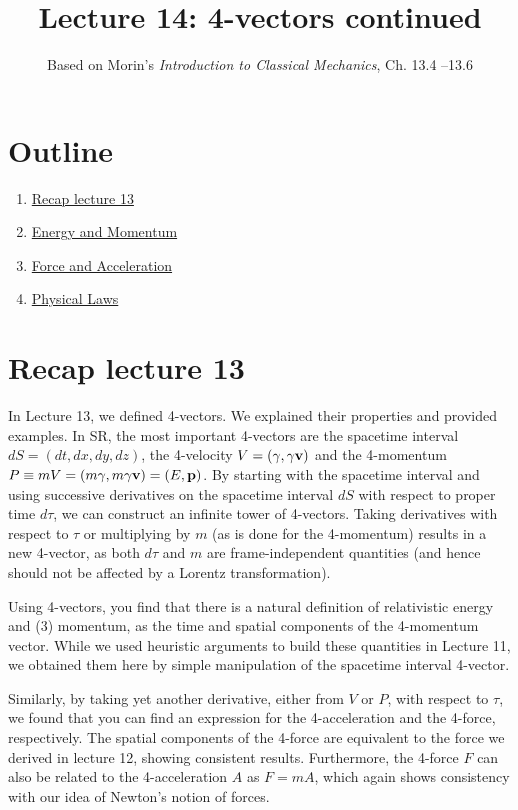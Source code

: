 \documentclass[12pt]{article}
\title{\textbf{Lecture 14: 4-vectors continued}}
\author{Based on Morin's \textit{Introduction to Classical Mechanics}, Ch. 13.4 --13.6}
\date{}
\begin{document}
\maketitle

\section*{Outline}
\begin{enumerate}
    \item \href{sec:recap}{Recap lecture 13}
    \item \href{sec:E&M}{Energy and Momentum}
    \item \href{sec:F&A}{Force and Acceleration}
    \item \href{sec:physics}{Physical Laws}
\end{enumerate}

\section{Recap lecture 13}\label{sec:recap}
In Lecture 13, we defined 4-vectors. We explained their properties and provided examples. In SR, the most important 4-vectors are the spacetime interval $dS = (dt,dx,dy,dz)$, the 4-velocity $V = (\gamma, \gamma{\bf v})$ and the 4-momentum $P \equiv mV = (m\gamma, m\gamma{\bf v}) = (E, {\bf p})$. By starting with the spacetime interval and using successive derivatives on the spacetime interval $dS$ with respect to proper time $d\tau$, we can construct an infinite tower of 4-vectors. Taking derivatives with respect to $\tau$ or multiplying by $m$ (as is done for the 4-momentum) results in a new 4-vector, as both $d \tau$ and $m$ are frame-independent quantities (and hence should not be affected by a Lorentz transformation).  

Using 4-vectors, you find that there is a natural definition of relativistic energy and (3) momentum, as the time and spatial components of the 4-momentum vector. While we used heuristic arguments to build these quantities in Lecture 11, we obtained them here by simple manipulation of the spacetime interval 4-vector. 

Similarly, by taking yet another derivative, either from $V$ or $P$, with respect to $\tau$, we found that you can find an expression for the 4-acceleration and the 4-force, respectively. The spatial components of the 4-force are equivalent to the force we derived in lecture 12, showing consistent results. Furthermore, the 4-force $F$ can also be related to the 4-acceleration $A$ as $F=mA$, which again shows consistency with our idea of Newton's notion of forces. 
\end{document}
